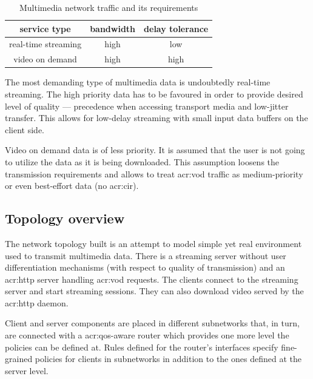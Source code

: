\documentclass[11pt,openany]{book}
\begin{document}
        \begin{table}[H]
          \begin{center}
            \begin{tabular}{|c|c|c|}
              \hline
              service type        & bandwidth & delay tolerance \\
              \hline \hline
              real-time streaming & high      & low             \\
              \hline
              video on demand     & high      & high            \\
              \hline
            \end{tabular}
          \end{center}

          \caption{Multimedia network traffic and its requirements}
          \label{tab:uc:qos}
        \end{table}

        The most demanding type of multimedia data is undoubtedly real-time streaming. The high priority data has to be
        favoured in order to provide desired level of quality --- precedence when accessing transport media and
        low-jitter transfer. This allows for low-delay streaming with small input data buffers on the client side.

        Video on demand data is of less priority. It is assumed that the user is not going to utilize the data as it is
        being downloaded. This assumption loosens the transmission requirements and allows to treat \gls{acr:vod}
        traffic as medium-priority or even best-effort data (no \gls{acr:cir}).


      \subsection{Topology overview}

        The network topology built is an attempt to model simple yet real environment used to transmit multimedia data.
        There is a streaming server without user differentiation mechanisms (with respect to quality of transmission)
        and an \gls{acr:http} server handling \gls{acr:vod} requests. The clients connect to the streaming server and
        start streaming sessions. They can also download video served by the \gls{acr:http} daemon.

        Client and server components are placed in different subnetworks that, in turn, are connected with a
        \gls{acr:qos}-aware router which provides one more level the policies can be defined at. Rules defined for the
        router's interfaces specify fine-grained policies for clients in subnetworks in addition to the ones defined at
        the server level.
\end{document}
